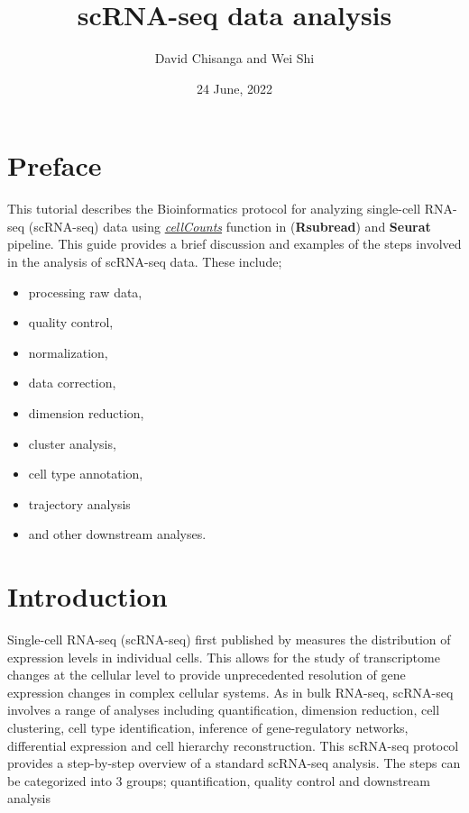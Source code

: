 \documentclass[
  openany]{book}
\title{scRNA-seq data analysis}
\author{David Chisanga and Wei Shi}
\date{24 June, 2022}
\providecommand{\tightlist}{%
  \setlength{\itemsep}{0pt}\setlength{\parskip}{0pt}}
\begin{document}
\maketitle

{
\setcounter{tocdepth}{1}
\tableofcontents
}
\hypertarget{preface}{%
\chapter{Preface}\label{preface}}

This tutorial describes the Bioinformatics protocol for analyzing single-cell RNA-seq (scRNA-seq) data using \href{https://rdrr.io/bioc/Rsubread/man/cellCounts.html}{\emph{cellCounts}} function in (\textbf{Rsubread}) and \textbf{Seurat} pipeline. This guide provides a brief discussion and examples of the steps involved in the analysis of scRNA-seq data. These include;

\begin{itemize}
\tightlist
\item
  processing raw data,
\item
  quality control,
\item
  normalization,
\item
  data correction,
\item
  dimension reduction,
\item
  cluster analysis,
\item
  cell type annotation,
\item
  trajectory analysis
\item
  and other downstream analyses.
\end{itemize}

\vspace{-100pt}

\vspace{-100pt}

\hypertarget{intro}{%
\chapter{Introduction}\label{intro}}

Single-cell RNA-seq (scRNA-seq) first published by \citep{tang2009mrna} measures the distribution of expression levels in individual cells. This allows for the study of transcriptome changes at the cellular level to provide unprecedented resolution of gene expression changes in complex cellular systems. As in bulk RNA-seq, scRNA-seq involves a range of analyses including quantification, dimension reduction, cell clustering, cell type identification, inference of gene-regulatory networks, differential expression and cell hierarchy reconstruction. This scRNA-seq protocol provides a step-by-step overview of a standard scRNA-seq analysis. The steps can be categorized into 3 groups; quantification, quality control and downstream analysis
\end{document}
